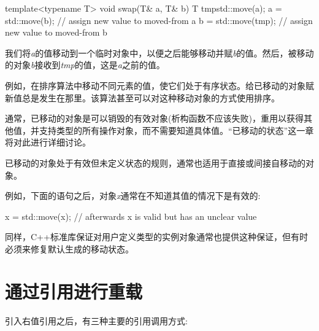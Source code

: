 \begin{codebox}[cpp]
template<typename T>
void swap(T& a, T& b)
{
  T tmp{std::move(a)};
  a = std::move(b); // assign new value to moved-from a
  b = std::move(tmp); // assign new value to moved-from b
}
\end{codebox}

我们将\textit{a}的值移动到一个临时对象中，以便之后能够移动并赋\textit{b}的值。然后，被移动的对象\textit{b}接收到\textit{tmp}的值，这是\textit{a}之前的值。\par

例如，在排序算法中移动不同元素的值，使它们处于有序状态。给已移动的对象赋新值总是发生在那里。该算法甚至可以对这种移动对象的方式使用排序。\par

通常，已移动的对象是可以销毁的有效对象(析构函数不应该失败)，重用以获得其他值，并支持类型的所有操作对象，而不需要知道具体值。“已移动的状态”这一章将对此进行详细讨论。\par


已移动的对象处于有效但未定义状态的规则，通常也适用于直接或间接自移动的对象。\par

例如，下面的语句之后，对象\textit{x}通常在不知道其值的情况下是有效的:\par

\begin{codebox}[cpp]
x = std::move(x); // afterwards x is valid but has an unclear value
\end{codebox}

同样，C++标准库保证对用户定义类型的实例对象通常也提供这种保证，但有时必须来修复默认生成的移动状态。\par


\section{通过引用进行重载}

引入右值引用之后，有三种主要的引用调用方式:\par

